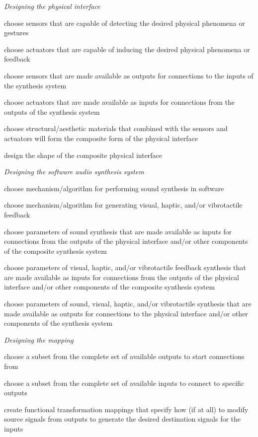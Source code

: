 \begin{description}
\item \emph{Designing the physical interface}
\begin{description}
\item choose sensors that are capable of detecting the desired physical phenomena or gestures
\item choose actuators that are capable of inducing the desired physical phenomena or feedback
\item choose sensors that are made available as outputs for connections to the inputs of the synthesis system
\item choose actuators that are made available as inputs for connections from the outputs of the synthesis system
\item choose structural/aesthetic materials that combined with the sensors and actuators will form the composite form of the physical interface
\item design the shape of the composite physical interface
\end{description}
\item \emph{Designing the software audio synthesis system}
\begin{description}
\item choose mechanism/algorithm for performing sound synthesis in software
\item choose mechanism/algorithm for generating visual, haptic, and/or vibrotactile feedback
\item choose parameters of sound synthesis that are made available as inputs for connections from the outputs of the physical interface and/or other components of the composite synthesis system
\item choose parameters of visual, haptic, and/or vibrotactile feedback synthesis that are made available as inputs for connections from the outputs of the physical interface and/or other components of the composite synthesis system
\item choose parameters of sound, visual, haptic, and/or vibrotactile synthesis that are made available as outputs for connections to the physical interface and/or other components of the synthesis system
\end{description}
\item \emph{Designing the mapping}
\begin{description}
	\item choose a subset from the complete set of available outputs to start connections from
	\item choose a subset from the complete set of available inputs to connect to specific outputs
	\item create functional transformation mappings that specify how (if at all) to modify source signals from outputs to generate the desired destination signals for the inputs
\end{description}
\end{description}

